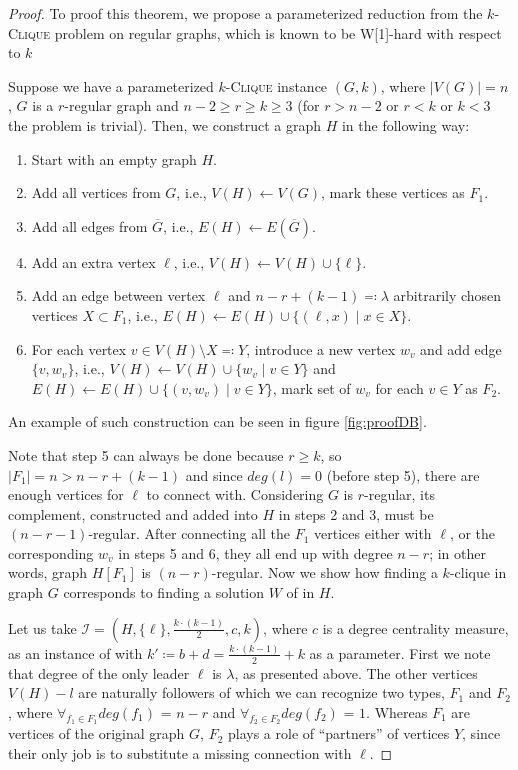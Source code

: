 \begin{proof}\label{proofDB}
    To proof this theorem, we propose a parameterized reduction from the $k$-\textsc{Clique} problem on regular graphs,
    which is known to be W[1]-hard with respect to $k$
    
    Suppose we have a parameterized $k$-\textsc{Clique} instance $(G, k)$, where $|V(G)|=n$, $G$ is a $r$-regular graph and $n-2 \geq r \geq k \geq 3$
    (for $r > n-2$ or $r < k$ or $k < 3$ the problem is trivial).
    Then, we construct a graph $H$ in the following way:
    \begin{enumerate}
        \item Start with an empty graph $H$.
        \item Add all vertices from $G$, i.e., $V(H) \leftarrow V(G)$, mark these vertices as $F_1$.
        \item Add all edges from $\overline{G}$, i.e., $E(H) \leftarrow E(\overline{G})$.
        \item Add an extra vertex $\ell$, i.e., $V(H) \leftarrow V(H) \cup \{\ell\}$.
        \item Add an edge between vertex $\ell$ and $n - r + (k - 1) \eqqcolon \lambda$ arbitrarily chosen vertices $X \subset F_1$,
              i.e., $E(H) \leftarrow E(H) \cup \{ (\ell, x) \mid x \in X \}$.
        \item For each vertex $v \in V(H) \setminus X \eqqcolon Y$, introduce a new vertex $w_v$ and add edge $\{v, w_v\}$, i.e.,
              $V(H) \leftarrow V(H) \cup \{ w_v \mid v \in Y \}$ and $E(H) \leftarrow E(H) \cup \{ (v, w_v) \mid v \in Y \}$,
              mark set of $w_v$ for each $v \in Y$ as $F_2$.
    \end{enumerate}
    An example of such construction can be seen in figure \ref{fig:proofDB}.

    Note that step 5 can always be done because $r \ge k$, so $|F_1| = n > n - r + (k - 1)$
    and since $deg(l) = 0$ (before step 5), there are enough vertices for $\ell$ to connect with.
    Considering $G$ is $r$-regular, its complement, constructed and added into $H$ in steps 2 and 3, must be $(n-r-1)$-regular.
    After connecting all the $F_1$ vertices either with $\ell$, or the corresponding $w_v$ in steps 5 and 6,
    they all end up with degree $n-r$;
    in other words, graph $H[F_1]$ is $(n-r)$-regular.
    Now we show how finding a $k$-clique in graph $G$ corresponds to finding a solution $W$ of \HLshort in $H$.

    Let us take $ \mathcal{I} = (H, \{\ell\}, \frac{k\cdot(k-1)}{2}, c, k)$, where $c$ is a degree centrality measure,
    as an instance of \HLshort with $k' \coloneqq b + d = \frac{k\cdot(k-1)}{2} + k$ as a parameter.
    First we note that degree of the only leader $\ell$ is $\lambda$, as presented above.
    The other vertices $V(H) - l$ are naturally followers of which we can recognize two types, $F_1$ and $F_2$,
    where $\forall_{f_1 \in F_1} deg(f_1)$ = $n-r$ and $\forall_{f_2 \in F_2} deg(f_2)$ = $1$.
    Whereas $F_1$ are vertices of the original graph $G$,
    $F_2$ plays a role of ``partners'' of vertices $Y$, since their only job is to substitute a missing connection with $\ell$.


\end{proof}
